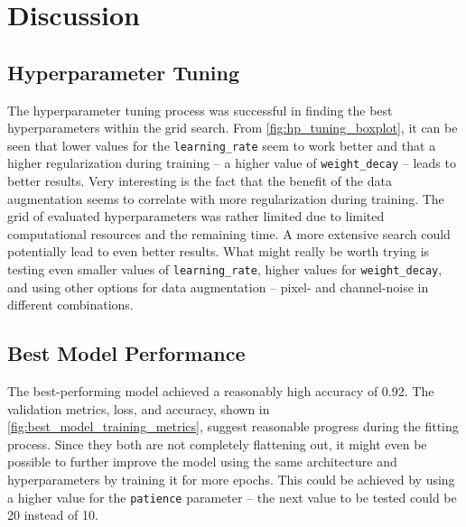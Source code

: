 


\section{Discussion}
\label{discussion}

\subsection{Hyperparameter Tuning}

The hyperparameter tuning process was successful in finding the best hyperparameters
within the grid search. From \autoref{fig:hp_tuning_boxplot}, it can be seen that
lower values for the \texttt{learning\_rate} seem to work better and that
a higher regularization during training -- a higher value of \texttt{weight\_decay} -- leads to
better results. Very interesting is the fact that the benefit of the data augmentation
seems to correlate with more regularization during training.
The grid of evaluated hyperparameters was rather limited due to limited computational
resources and the remaining time. A more extensive search could potentially lead to
even better results. What might really be worth trying is testing even smaller
values of \texttt{learning\_rate}, higher values for \texttt{weight\_decay}, 
and using other options for data augmentation --
pixel- and channel-noise in different combinations.

\subsection{Best Model Performance}

The best-performing model achieved a reasonably high accuracy of 0.92. The validation
metrics, loss, and accuracy, shown in \autoref{fig:best_model_training_metrics},
suggest reasonable progress during the fitting process. Since they both are not
completely flattening out, it might even be possible to further improve the model
using the same architecture and hyperparameters by training it for more epochs.
This could be achieved by using a higher value for the \texttt{patience} parameter --
the next value to be tested could be 20 instead of 10.

